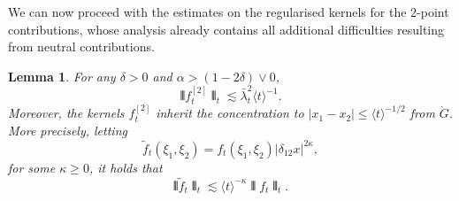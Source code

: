 \documentclass[11pt, a4paper]{scrartcl}
\numberwithin{equation}{section}
\theoremstyle{plain}
\newtheorem{lemma}[foo]{Lemma}
\theoremstyle{remark}
\begin{document}
We can now proceed with the estimates on the regularised kernels for the $2$-point contributions, whose analysis already contains all additional
difficulties resulting from neutral contributions.

\begin{lemma}
	\label{lem:f2-kernel-scaling}For any $\delta > 0$ and $\alpha > (1 - 2
		\delta) \vee 0$,
	\begin{equation}
		\interleave f_t^{[2]} \interleave_t \lesssim \bar{\lambda}_t^2 \langle t
		\rangle^{- 1} . \label{eq:f2-bounds}
	\end{equation}
	Moreover, the kernels $f^{[2]}_t$ inherit the concentration to $| x_1 - x_2
		| \leqslant \langle t \rangle^{- 1 / 2}$ from $\dot{G}$. More precisely,
	letting
	\[ \tilde{f}_t (\xi_1, \xi_2) = f_t (\xi_1, \xi_2) | \delta_{12} x |^{2
				\kappa}, \]
	for some $\kappa \geqslant 0$, it holds that
	\begin{equation}
		\interleave \tilde{f}_t \interleave_t \lesssim \langle t \rangle^{-
			\kappa} \interleave f_t \interleave_t . \label{eq:coeff-concentration}
	\end{equation}
\end{lemma}
\end{document}
